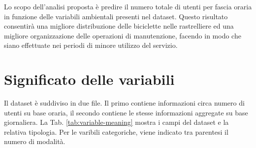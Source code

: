\documentclass[a4paper, 10pt]{report}
\begin{document}
Lo scopo dell'analisi proposta è predire il numero totale di utenti per
fascia oraria in funzione delle variabili ambientali presenti nel dataset.
Questo risultato consentirà una migliore distribuzione delle biciclette nelle
rastrelliere ed una migliore organizzazione delle operazioni di manutenzione,
facendo in modo che siano effettuate nei periodi di minore utilizzo del servizio.



\section{Significato delle variabili}
Il dataset è suddiviso in due file. Il primo contiene informazioni circa numero
di utenti su base oraria, il secondo contiene le stesse informazioni aggregate
su base giornaliera. La Tab. \ref{tab:variable-meaning} mostra i campi
del dataset e la relativa tipologia. Per le varibili categoriche, viene indicato
tra parentesi il numero di modalità.
\end{document}
